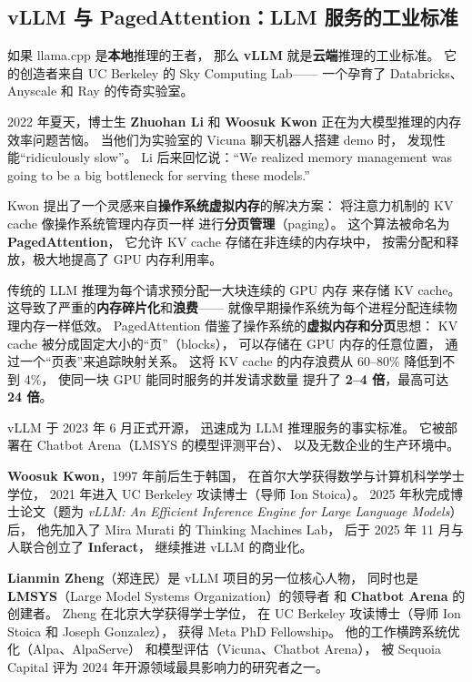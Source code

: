 \subsection{vLLM 与 PagedAttention：LLM 服务的工业标准}
\label{subsec:vllm}

如果 llama.cpp 是\textbf{本地}推理的王者，
那么 \textbf{vLLM} 就是\textbf{云端}推理的工业标准。
它的创造者来自 UC Berkeley 的 Sky Computing Lab——
一个孕育了 Databricks、Anyscale 和 Ray 的传奇实验室。

2022 年夏天，博士生 \textbf{Zhuohan Li} 和 \textbf{Woosuk Kwon}
正在为大模型推理的内存效率问题苦恼。
当他们为实验室的 Vicuna 聊天机器人搭建 demo 时，
发现性能``ridiculously slow''。
Li 后来回忆说：``We realized memory management was going to be
a big bottleneck for serving these models.''

Kwon 提出了一个灵感来自\textbf{操作系统虚拟内存}的解决方案：
将注意力机制的 KV cache 像操作系统管理内存页一样
进行\textbf{分页管理}（paging）。
这个算法被命名为 \textbf{PagedAttention}，
它允许 KV cache 存储在非连续的内存块中，
按需分配和释放，极大地提高了 GPU 内存利用率。

\begin{keybox}
传统的 LLM 推理为每个请求预分配一大块连续的 GPU 内存
来存储 KV cache。
这导致了严重的\textbf{内存碎片化}和\textbf{浪费}——
就像早期操作系统为每个进程分配连续物理内存一样低效。
PagedAttention 借鉴了操作系统的\textbf{虚拟内存和分页}思想：
KV cache 被分成固定大小的``页''（blocks），
可以存储在 GPU 内存的任意位置，
通过一个``页表''来追踪映射关系。
这将 KV cache 的内存浪费从 60--80\% 降低到不到 4\%，
使同一块 GPU 能同时服务的并发请求数量
提升了 \textbf{2--4 倍}，最高可达 \textbf{24 倍}。
\end{keybox}

vLLM 于 2023 年 6 月正式开源，
迅速成为 LLM 推理服务的事实标准。
它被部署在 Chatbot Arena（LMSYS 的模型评测平台）、
以及无数企业的生产环境中。

\textbf{Woosuk Kwon}，1997 年前后生于韩国，
在首尔大学获得数学与计算机科学学士学位，
2021 年进入 UC Berkeley 攻读博士（导师 Ion Stoica）。
2025 年秋完成博士论文（题为
\textit{vLLM: An Efficient Inference Engine for Large Language Models}）后，
他先加入了 Mira Murati 的 Thinking Machines Lab，
后于 2025 年 11 月与人联合创立了 \textbf{Inferact}，
继续推进 vLLM 的商业化。

\textbf{Lianmin Zheng}（郑连民）是 vLLM 项目的另一位核心人物，
同时也是 \textbf{LMSYS}（Large Model Systems Organization）的领导者
和 \textbf{Chatbot Arena} 的创建者。
Zheng 在北京大学获得学士学位，
在 UC Berkeley 攻读博士（导师 Ion Stoica 和 Joseph Gonzalez），
获得 Meta PhD Fellowship。
他的工作横跨系统优化（Alpa、AlpaServe）
和模型评估（Vicuna、Chatbot Arena），
被 Sequoia Capital 评为 2024 年开源领域最具影响力的研究者之一。


